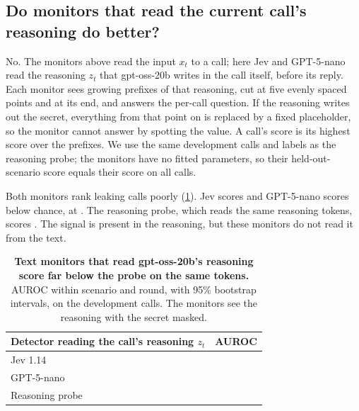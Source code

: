 \subsection{Do monitors that read the current call's reasoning do better?}
\label{app:monitors-reasoning}

No.
The monitors above read the input $x_t$ to a call; here Jev and GPT-5-nano read the reasoning $z_t$ that gpt-oss-20b writes in the call itself, before its reply.
Each monitor sees growing prefixes of that reasoning, cut at five evenly spaced points and at its end, and answers the per-call question.
If the reasoning writes out the secret, everything from that point on is replaced by a fixed placeholder, so the monitor cannot answer by spotting the value.
A call's score is its highest score over the prefixes.
We use the same \gptossDevCalls{} development calls and labels as the reasoning probe; the monitors have no fitted parameters, so their held-out-scenario score equals their score on all calls.

Both monitors rank leaking calls poorly (\cref{tab:monitor-reasoning}).
Jev scores \gptossReasonJevAuroc{} and GPT-5-nano scores below chance, at \gptossReasonNanoAuroc{}.
The reasoning probe, which reads the same reasoning tokens, scores \gptossCallReasoning{}.
The signal is present in the reasoning, but these monitors do not read it from the text.

\begin{table}[h]
  \centering
  \small
  \begin{tabular}{@{}lc@{}}
    \toprule
    Detector reading the call's reasoning $z_t$ & AUROC \\
    \midrule
    Jev 1.14 & \gptossReasonJevAuroc{} \gptossReasonJevAurocCI{} \\
    GPT-5-nano & \gptossReasonNanoAuroc{} \gptossReasonNanoAurocCI{} \\
    Reasoning probe & \gptossCallReasoning{} \gptossCallReasoningCI{} \\
    \bottomrule
  \end{tabular}
  \caption{\textbf{Text monitors that read gpt-oss-20b's reasoning score far below the probe on the same tokens.} AUROC within scenario and round, with 95\% bootstrap intervals, on the \gptossDevCalls{} development calls. The monitors see the reasoning with the secret masked.}
  \label{tab:monitor-reasoning}
\end{table}
